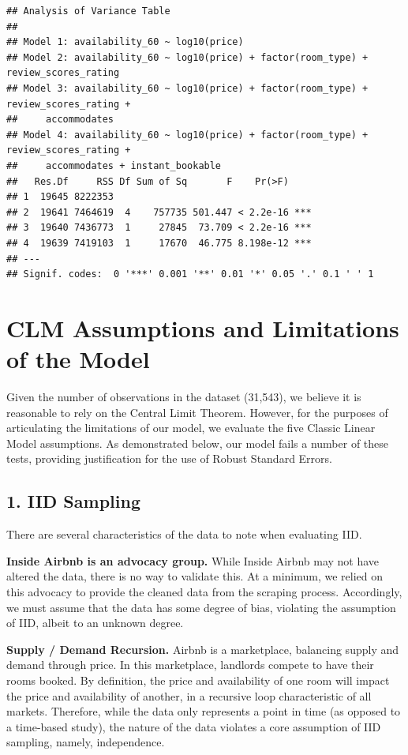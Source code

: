 \documentclass[
]{article}
\begin{document}
\begin{verbatim}
## Analysis of Variance Table
## 
## Model 1: availability_60 ~ log10(price)
## Model 2: availability_60 ~ log10(price) + factor(room_type) + review_scores_rating
## Model 3: availability_60 ~ log10(price) + factor(room_type) + review_scores_rating + 
##     accommodates
## Model 4: availability_60 ~ log10(price) + factor(room_type) + review_scores_rating + 
##     accommodates + instant_bookable
##   Res.Df     RSS Df Sum of Sq       F    Pr(>F)    
## 1  19645 8222353                                   
## 2  19641 7464619  4    757735 501.447 < 2.2e-16 ***
## 3  19640 7436773  1     27845  73.709 < 2.2e-16 ***
## 4  19639 7419103  1     17670  46.775 8.198e-12 ***
## ---
## Signif. codes:  0 '***' 0.001 '**' 0.01 '*' 0.05 '.' 0.1 ' ' 1
\end{verbatim}

\hypertarget{clm-assumptions-and-limitations-of-the-model}{%
\section{CLM Assumptions and Limitations of the Model}\label{clm-assumptions-and-limitations-of-the-model}}

Given the number of observations in the dataset (31,543), we believe it is reasonable to rely on the Central Limit Theorem. However, for the purposes of articulating the limitations of our model, we evaluate the five Classic Linear Model assumptions. As demonstrated below, our model fails a number of these tests, providing justification for the use of Robust Standard Errors.

\hypertarget{iid-sampling}{%
\subsection{\texorpdfstring{\textbf{1. IID Sampling}}{1. IID Sampling}}\label{iid-sampling}}

There are several characteristics of the data to note when evaluating IID.

\textbf{Inside Airbnb is an advocacy group.} While Inside Airbnb may not have altered the data, there is no way to validate this. At a minimum, we relied on this advocacy to provide the cleaned data from the scraping process. Accordingly, we must assume that the data has some degree of bias, violating the assumption of IID, albeit to an unknown degree.

\textbf{Supply / Demand Recursion.} Airbnb is a marketplace, balancing supply and demand through price. In this marketplace, landlords compete to have their rooms booked. By definition, the price and availability of one room will impact the price and availability of another, in a recursive loop characteristic of all markets. Therefore, while the data only represents a point in time (as opposed to a time-based study), the nature of the data violates a core assumption of IID sampling, namely, independence.
\end{document}

